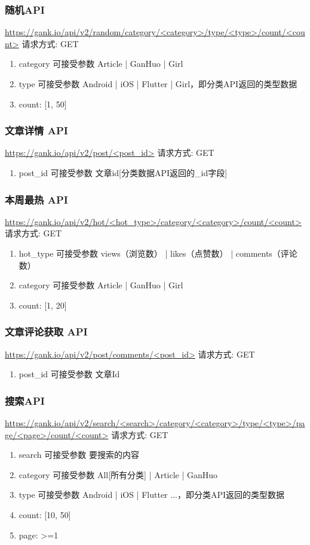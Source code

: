 \documentclass[12pt,a4paper,UTF8]{ctexart}
\begin{document}
    \subsubsection{随机API}
    \url{https://gank.io/api/v2/random/category/<category>/type/<type>/count/<count>}
    请求方式: GET
    \begin{enumerate}
        \item category 可接受参数 Article | GanHuo | Girl
        \item type 可接受参数 Android | iOS | Flutter | Girl，即分类API返回的类型数据
        \item count: [1, 50]
    \end{enumerate}
    \subsubsection{文章详情 API}
    \url{https://gank.io/api/v2/post/<post_id>}
    请求方式: GET
    \begin{enumerate}
        \item post\_id 可接受参数 文章id[分类数据API返回的\_id字段]
    \end{enumerate}
    \subsubsection{本周最热 API}
    \url{https://gank.io/api/v2/hot/<hot_type>/category/<category>/count/<count>}
    请求方式: GET
    \begin{enumerate}
        \item hot\_type 可接受参数 views（浏览数） | likes（点赞数） | comments（评论数）
        \item category 可接受参数 Article | GanHuo | Girl
        \item count: [1, 20]
    \end{enumerate}
    \subsubsection{文章评论获取 API}
    \url{https://gank.io/api/v2/post/comments/<post_id>}
    请求方式: GET
    \begin{enumerate}
        \item post\_id 可接受参数 文章Id
    \end{enumerate}
    \subsubsection{搜索API}
    \url{https://gank.io/api/v2/search/<search>/category/<category>/type/<type>/page/<page>/count/<count>}
    请求方式: GET
    \begin{enumerate}
        \item search 可接受参数 要搜索的内容
        \item category 可接受参数 All[所有分类] | Article | GanHuo
        \item type 可接受参数 Android | iOS | Flutter ...，即分类API返回的类型数据
        \item count: [10, 50]
        \item page: >=1
    \end{enumerate}
\end{document}
